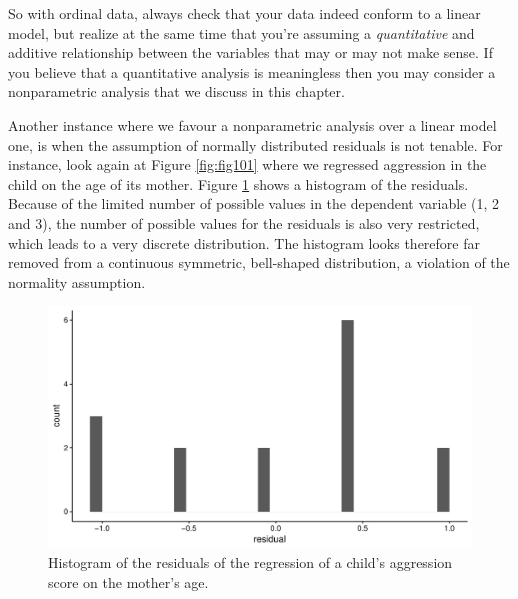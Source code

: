 \documentclass[]{book}\usepackage[]{graphicx}\usepackage[]{color}
\makeatletter
\def\maxwidth{ %
  \ifdim\Gin@nat@width>\linewidth
    \linewidth
  \else
    \Gin@nat@width
  \fi
}
\newenvironment{knitrout}{}{} %
\makeatother
\begin{document}
So with ordinal data, always check that your data indeed conform to a linear model, but realize at the same time that you're assuming a \textit{quantitative} and additive relationship between the variables that may or may not make sense. If you believe that a quantitative analysis is meaningless then you may consider a nonparametric analysis that we discuss in this chapter. 

Another instance where we favour a nonparametric analysis over a linear model one, is when the assumption of normally distributed residuals is not tenable. For instance, look again at Figure \ref{fig:fig101} where we regressed aggression in the child on the age of its mother. Figure \ref{fig:fig1201} shows a histogram of the residuals. Because of the limited number of possible values in the dependent variable (1, 2 and 3), the number of possible values for the residuals is also very restricted, which leads to a very discrete distribution. The histogram looks therefore far removed from a continuous symmetric, bell-shaped distribution, a violation of the normality assumption. 

\begin{knitrout}
\color{fgcolor}\begin{figure}

{\centering \includegraphics[width=\maxwidth]{figure/fig1201-1} 

}

\caption[Histogram of the residuals of the regression of a child's aggression score on the mother's age]{Histogram of the residuals of the regression of a child's aggression score on the mother's age.}\label{fig:fig1201}
\end{figure}


\end{knitrout}
\end{document}
